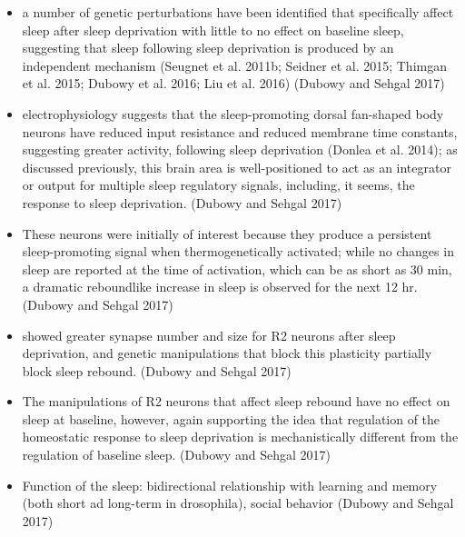 \documentclass[11pt]{article}
\begin{document}
\begin{itemize}
    \item a number of genetic perturbations have been identified that specifically affect sleep
    after sleep deprivation with little to no effect on baseline sleep, suggesting that sleep 
    following sleep deprivation is produced by an independent mechanism (Seugnet et al. 2011b;
    Seidner et al. 2015; Thimgan et al. 2015; Dubowy et al. 2016; Liu et al. 2016)
    \parencite{dubowyCircadianRhythmsSleep2017} (Dubowy and Sehgal 2017)

    \item electrophysiology suggests that the sleep-promoting dorsal fan-shaped body neurons have
    reduced input resistance and reduced membrane time constants, suggesting greater activity, 
    following sleep deprivation (Donlea et al. 2014); as discussed previously, this brain area 
    is well-positioned to act as an integrator or output for multiple sleep regulatory signals, 
    including, it seems, the response to sleep deprivation.
    \parencite{dubowyCircadianRhythmsSleep2017} (Dubowy and Sehgal 2017)

    \item These neurons were initially of interest because they produce a persistent sleep-promoting 
    signal when thermogenetically activated; while no changes in sleep are reported at the time of 
    activation, which can be as short as 30 min, a dramatic reboundlike increase in sleep is observed
    for the next 12 hr.
    \parencite{dubowyCircadianRhythmsSleep2017} (Dubowy and Sehgal 2017)

    \item showed greater synapse number and size for R2 neurons after sleep deprivation, and 
    genetic manipulations that block this plasticity partially block sleep rebound.
    \parencite{dubowyCircadianRhythmsSleep2017} (Dubowy and Sehgal 2017)

    \item The manipulations of R2 neurons that affect sleep rebound have no effect on sleep at 
    baseline, however, again supporting the idea that regulation of the
    homeostatic response to sleep deprivation is mechanistically different from the regulation
    of baseline sleep.
    \parencite{dubowyCircadianRhythmsSleep2017} (Dubowy and Sehgal 2017)

    \item Function of the sleep: bidirectional relationship with learning and memory 
    (both short ad long-term in drosophila),
    social behavior
    \parencite{dubowyCircadianRhythmsSleep2017} (Dubowy and Sehgal 2017)


\end{itemize}
\end{document}
